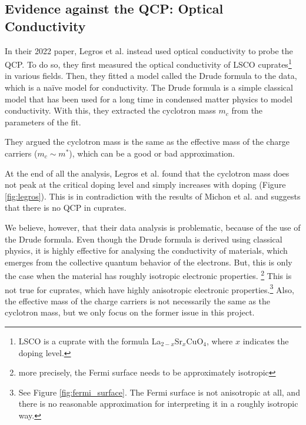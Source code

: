 \subsection{Evidence against the QCP: Optical Conductivity}
In their 2022 paper, Legros et al.\cite{legros2022} instead used optical conductivity to
probe the QCP. To do so, they first measured the optical conductivity of LSCO cuprates\footnote{
LSCO is a cuprate with the formula La$_{2-x}$Sr$_x$CuO$_4$, where $x$ indicates the doping level.}
in various fields. Then, they fitted a model called the Drude formula to the data, which is a naïve
model for conductivity. The Drude formula is a simple classical model that has been used for a long
time in condensed matter physics to model conductivity. With this, they extracted the cyclotron mass
$m_c$ from the parameters of the fit.

They argued the cyclotron mass is the same as the effective mass of the charge carriers
($m_c \sim m^*$), which can be a good or bad approximation.

At the end of all the analysis, Legros et al. found that the cyclotron mass does not peak
at the critical doping level and simply increases with doping (Figure \ref{fig:legros}). This is in contradiction with the
results of Michon et al. and suggests that there is no QCP in cuprates.

We believe, however, that their data analysis is problematic, because of the use of the Drude
formula. Even though the Drude formula is derived using classical physics, it is highly effective for
analysing the conductivity of materials, which emerges from the collective quantum behavior of the
electrons. But, this is only the case when the material has roughly isotropic electronic properties.
\footnote{more precisely, the Fermi surface needs to be approximately isotropic} This is not true
for cuprates, which have highly anisotropic electronic properties.\footnote{See Figure
\ref{fig:fermi_surface}. The Fermi surface is not anisotropic at all, and there is no reasonable
approximation for interpreting it in a roughly isotropic way.} Also, the effective mass of the
charge carriers is not necessarily the same as the cyclotron mass, but we only focus on the former
issue in this project.
